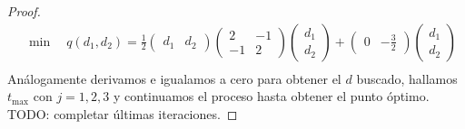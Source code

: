 \documentclass{article}
\begin{document}
\begin{proof}
    \begin{align*}
         & \min \quad q(d_1, d_2) = \frac{1}{2} \begin{pmatrix}
                                                    d_1 & d_2
                                                \end{pmatrix} \begin{pmatrix}
                                                                  2  & -1 \\
                                                                  -1 & 2
                                                              \end{pmatrix} \begin{pmatrix}
                                                                                d_1 \\
                                                                                d_2
                                                                            \end{pmatrix} + \begin{pmatrix}
                                                                                                0 & -\frac{3}{2}
                                                                                            \end{pmatrix} \begin{pmatrix}
                                                                                                              d_1 \\
                                                                                                              d_2
                                                                                                          \end{pmatrix} \\
    \end{align*}
    Análogamente derivamos e igualamos a cero para obtener el \( d \) buscado, hallamos \( t_{\max} \) con \( j = 1, 2, 3 \) y continuamos el proceso hasta obtener el punto óptimo. TODO: completar últimas iteraciones.
\end{proof}
\end{document}
